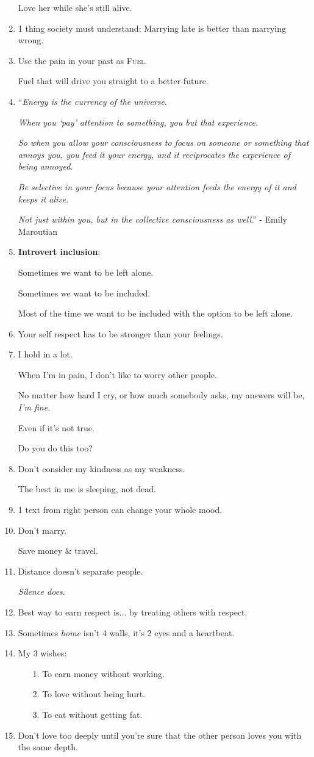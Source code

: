 \documentclass{article}
\begin{document}
\begin{enumerate}
	Love her while she's still alive.
	\item 1 thing society must understand: Marrying late is better than marrying wrong.
	\item Use the pain in your past as \textsc{Fuel}.
	
	Fuel that will drive you straight to a better future.
	\item ``\textit{Energy is the currency of the universe}.
	
	\textit{When you `pay' attention to something, you but that experience}.
	
	\textit{So when you allow your consciousness to focus on someone or something that annoys you, you feed it your energy, and it reciprocates the experience of being annoyed}.
	
	\textit{Be selective in your focus because your attention feeds the energy of it and keeps it alive}.
	
	\textit{Not just within you, but in the collective consciousness as well}.'' - Emily Maroutian
	\item \textbf{Introvert inclusion}:
	
	Sometimes we want to be left alone.
	
	Sometimes we want to be included.
	
	Most of the time we want to be included with the option to be left alone.
	\item Your self respect has to be stronger than your feelings.
	\item I hold in a lot.
	
	When I'm in pain, I don't like to worry other people.
	
	No matter how hard I cry, or how much somebody asks, my answers will be, \textit{I'm fine}.
	
	Even if it's not true.
	
	Do you do this too?
	\item Don't consider my kindness as my weakness.
	
	The best in me is sleeping, not dead.
	\item 1 text from right person can change your whole mood.
	\item Don't marry.
	
	Save money \& travel.
	\item Distance doesn't separate people.
	
	\textit{Silence does}.
	\item Best way to earn respect is$\ldots$ by treating others with respect.
	\item Sometimes \textit{home} isn't 4 walls, it's 2 eyes and a heartbeat.
	\item My 3 wishes:
	\begin{itemize}
		\item[1.] To earn money without working.
		\item[2.] To love without being hurt.
		\item[3.] To eat without getting fat.
	\end{itemize}
	\item Don't love too deeply until you're sure that the other person loves you with the same depth.
	

\end{enumerate}
\end{document}
